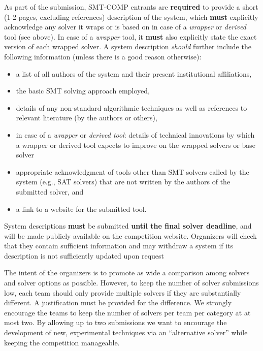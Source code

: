 \documentclass[12pt]{article}
\begin{document}
%
As part of the submission, SMT-COMP entrants are \textbf{required} to provide a
short (1-2 pages, excluding references) description of the system, which \textbf{must} explicitly
acknowledge any solver it wraps or is based on in case of a \emph{wrapper} or
\emph{derived} tool (see above).
In case of a \emph{wrapper} tool, it \textbf{must} also explicitly state
the exact version of each wrapped solver.
A system description \emph{should} further include the following information
(unless there is a good reason otherwise):
\begin{itemize}[itemsep=0ex]
  \item a list of all authors of the system and their present institutional
    affiliations,
  \item the basic SMT solving approach employed,
  \item details of any non-standard algorithmic techniques as well as
    references to relevant literature (by the authors or others),
  \item in case of a \emph{wrapper} or \emph{derived tool}: details of
    technical innovations by which a wrapper or derived tool expects to improve
    on the wrapped solvers or base solver
  \item appropriate acknowledgment of tools other than SMT solvers called by
    the system (e.g., SAT solvers) that are not written by the authors of the
    submitted solver, and
  \item a link to a website for the submitted tool.
\end{itemize}
System descriptions \textbf{must} be submitted \textbf{until the final solver
deadline}, and will be made publicly available on the competition website.
Organizers will check that they contain sufficient information
and may withdraw a system if its description is not sufficiently updated upon
request

%
The intent of the organizers is to promote as wide a comparison among
solvers and solver options as possible.  However, to keep the number of
solver submissions low, each team should only provide multiple solvers
if they are  substantially different.  A justification must be provided
for the difference.  We strongly encourage the teams to keep the number
of solvers per team per category at at most two. By allowing
up to two submissions we want to encourage the development of new,
experimental techniques via an ``alternative solver'' while keeping
the competition manageable.
\end{document}
